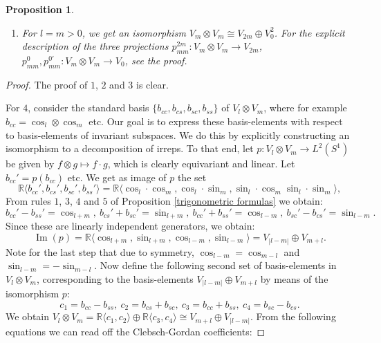 \documentclass[12pt, a4paper]{article}
\theoremstyle{plain}
\newtheorem{pro}{Proposition}[section]
\theoremstyle{definition}
\theoremstyle{remark}
\newcommand{\R}{\mathds{R}}
\DeclareMathOperator{\im}{Im}
\begin{document}
\begin{pro}
\begin{enumerate}
\item For $l = m > 0$, we get an isomorphism $V_m \otimes V_m \cong V_{2m} \oplus V_0^2$. For the explicit description of the three projections $p_{mm}^{2m}: V_m \otimes V_m \to V_{2m}$, $p_{mm}^{0}, p_{mm}^{0'}: V_{m} \otimes V_{m} \to V_0$, see the proof.
\end{enumerate}
\end{pro}

\begin{proof}
The proof of $1$, $2$ and $3$ is clear.

For $4$, consider the standard basis $\{b_{cc}, b_{cs}, b_{sc}, b_{ss}\}$ of $V_{l} \otimes V_m$, where for example $b_{cc} = \cos_l \otimes \cos_m$ etc. Our goal is to express these basis-elements with respect to basis-elements of invariant subspaces. We do this by explicitly constructing an isomorphism to a decomposition of irreps. To that end, let $p: V_l \otimes V_m \to L^2(S^1)$ be given by $f \otimes g \mapsto f \cdot g$, which is clearly equivariant and linear. Let $b_{cc}' = p(b_{cc})$ etc. We get as image of $p$ the set
\begin{equation*}
\R \langle b_{cc}', b_{cs}', b_{sc}', b_{ss}' \rangle  = \R\langle \cos_l \cdot \cos_m, \cos_l \cdot \sin_m, \sin_l \cdot \cos_m \sin_l \cdot \sin_m\rangle,
\end{equation*}
From rules $1$, $3$, $4$ and $5$ of Proposition \ref{trigonometric formulas} we obtain:
\begin{equation*}
b_{cc}' - b_{ss}' = \cos_{l+m}, \ b_{cs}' + b_{sc}' = \sin_{l+m}, \ b_{cc}' + b_{ss}' = \cos_{l-m}, \ b_{sc}' - b_{cs}' = \sin_{l-m}.
\end{equation*}
Since these are linearly independent generators, we obtain:
\begin{equation*}
\im(p) = \R \langle \cos_{l+m}, \sin_{l+m}, \cos_{l-m}, \sin_{l-m}\rangle = V_{|l-m|} \oplus V_{m+l} .
\end{equation*}
Note for the last step that due to symmetry, $\cos_{l-m} = \cos_{m-l}$ and $\sin_{l-m} = - \sin_{m-l}$. Now define the following second set of basis-elements in $V_l \otimes V_m$, corresponding to the basis-elements $V_{|l-m|} \oplus V_{m+l}$ by means of the isomorphism $p$:
\begin{equation*}
c_1 = b_{cc} - b_{ss}, \ c_2 = b_{cs} + b_{sc}, \  c_3 = b_{cc} + b_{ss}, \  c_{4} = b_{sc} - b_{cs}.
\end{equation*}
We obtain $V_l \otimes V_m = \R\langle c_1, c_2\rangle \oplus \R\langle c_3, c_4\rangle \cong V_{m+l} \oplus V_{|l-m|}$. From the following equations we can read off the Clebsch-Gordan coefficients:

\end{proof}
\end{document}
